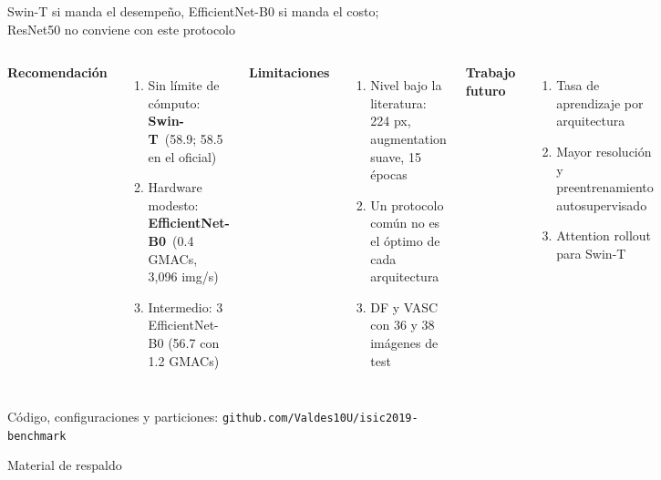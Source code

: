 \documentclass[aspectratio=169,11pt]{beamer}
\newcommand{\E}{\textcolor{effnet}{\textbf{EfficientNet-B0}}}
\newcommand{\Sw}{\textcolor{swin}{\textbf{Swin-T}}}
\begin{document}
\begin{frame}{Swin-T si manda el desempeño, EfficientNet-B0 si manda el costo;\\ResNet50 no conviene con este protocolo}
\small
\begin{columns}[T,onlytextwidth]
\textbf{Recomendación}
\begin{enumerate}
\item Sin límite de cómputo: \Sw\ (58.9; 58.5 en el oficial)
\item Hardware modesto: \E\ (0.4 GMACs, 3,096 img/s)
\item Intermedio: 3 EfficientNet-B0 (56.7 con 1.2 GMACs)
\end{enumerate}
\textbf{Limitaciones}
\begin{enumerate}
\item Nivel bajo la literatura: 224 px, augmentation suave, 15 épocas
\item Un protocolo común no es el óptimo de cada arquitectura
\item DF y VASC con 36 y 38 imágenes de test
\end{enumerate}
\textbf{Trabajo futuro}
\begin{enumerate}
\item Tasa de aprendizaje por arquitectura
\item Mayor resolución y preentrenamiento autosupervisado
\item Attention rollout para Swin-T
\end{enumerate}
\end{columns}
\vfill
\centering\footnotesize\color{gray} Código, configuraciones y particiones: \texttt{github.com/Valdes10U/isic2019-benchmark}
\end{frame}

\appendix

\begin{frame}[standout]
Material de respaldo
\end{frame}
\end{document}
